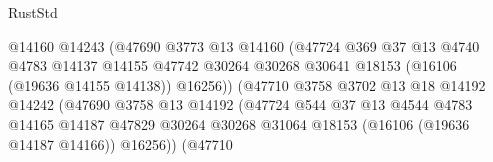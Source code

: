 \begin{lexlean}{RustStd}
\begin{coremodule}
                                            @14160
                                            @14243
                                            (@47690
                                              @3773
                                              @13
                                              @14160
                                              (@47724
                                                @369
                                                @37
                                                @13
                                                @4740
                                                @4783
                                                @14137
                                                @14155
                                                @47742
                                                @30264
                                                @30268
                                                @30641
                                                @18153
                                                (@16106 (@19636 @14155 @14138))
                                                @16256))
                                            (@47710
                                              @3758
                                              @3702
                                              @13
                                              @18
                                              @14192
                                              @14242
                                              (@47690
                                                @3758
                                                @13
                                                @14192
                                                (@47724
                                                  @544
                                                  @37
                                                  @13
                                                  @4544
                                                  @4783
                                                  @14165
                                                  @14187
                                                  @47829
                                                  @30264
                                                  @30268
                                                  @31064
                                                  @18153
                                                  (@16106 (@19636 @14187 @14166))
                                                  @16256))
                                              (@47710

\end{coremodule}
\end{lexlean}
